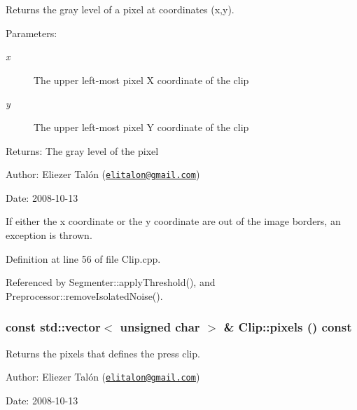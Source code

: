 Returns the gray level of a pixel at coordinates (x,y). 

\begin{Desc}
\item[Parameters:]
\begin{description}
\item[{\em x}]The upper left-most pixel X coordinate of the clip \item[{\em y}]The upper left-most pixel Y coordinate of the clip\end{description}
\end{Desc}
\begin{Desc}
\item[Returns:]The gray level of the pixel\end{Desc}
\begin{Desc}
\item[Author:]Eliezer Talón (\href{mailto:elitalon@gmail.com}{\tt elitalon@gmail.com}) \end{Desc}
\begin{Desc}
\item[Date:]2008-10-13\end{Desc}
If either the x coordinate or the y coordinate are out of the image borders, an exception is thrown. 

Definition at line 56 of file Clip.cpp.

Referenced by Segmenter::applyThreshold(), and Preprocessor::removeIsolatedNoise().\hypertarget{class_clip_2d705268c905b41efd5caad63e4b3b4f}{
\subsubsection[pixels]{\setlength{\rightskip}{0pt plus 5cm}const std::vector$<$ unsigned char $>$ \& Clip::pixels () const}}
\label{class_clip_2d705268c905b41efd5caad63e4b3b4f}


Returns the pixels that defines the press clip. 

\begin{Desc}
\item[Author:]Eliezer Talón (\href{mailto:elitalon@gmail.com}{\tt elitalon@gmail.com}) \end{Desc}
\begin{Desc}
\item[Date:]2008-10-13 \end{Desc}


